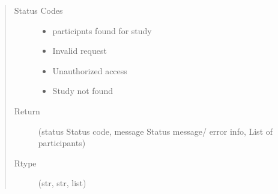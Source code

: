 \documentclass[letterpaper,10pt,english]{sphinxmanual}
\begin{document}
\begin{fulllineitems}
\begin{fulllineitems}
\begin{quote}
\begin{description}
\begin{itemize}
\end{itemize}

\item[{Status Codes}] \leavevmode\begin{itemize}
\item {} 
 \textendash{} participnts found for study

\item {} 
 \textendash{} Invalid request

\item {} 
 \textendash{} Unauthorized access

\item {} 
 \textendash{} Study not found

\end{itemize}

\item[{Return}] \leavevmode
(status Status code, message Status message/ error info, List of participants)

\item[{Rtype}] \leavevmode
(str, str, list)

\end{description}\end{quote}

\end{fulllineitems}


\end{fulllineitems}
\end{document}
